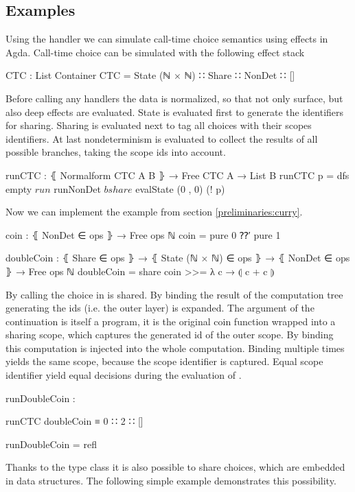 \subsection{Examples}

Using the handler we can simulate call-time choice semantics using effects in
Agda.
Call-time choice can be simulated with the following effect stack

\begin{code}
CTC : List Container
CTC = State (ℕ × ℕ) ∷ Share ∷ NonDet ∷ []
\end{code}
Before calling any handlers the data is normalized, so that not only surface,
but also deep effects are evaluated.
State is evaluated first to generate the identifiers for sharing.
Sharing is evaluated next to tag all choices with their scopes identifiers.
At last nondeterminism is evaluated to collect the results of all possible
branches, taking the scope ids into account.

\begin{code}
runCTC : ⦃ Normalform CTC A B ⦄ → Free CTC A → List B
runCTC p = dfs empty $ run $ runNonDet $ bshare $ evalState (0 , 0) (! p)
\end{code}
Now we can implement the  example from section
\ref{preliminaries:curry}.

\begin{code}
coin : ⦃ NonDet ∈ ops ⦄ → Free ops ℕ
coin = pure 0 ⁇′ pure 1

doubleCoin : ⦃ Share ∈ ops ⦄ → ⦃ State (ℕ × ℕ) ∈ ops ⦄ → ⦃ NonDet ∈ ops ⦄ →
  Free ops ℕ
doubleCoin = share coin >>= λ c → ⦇ c + c ⦈
\end{code}
By calling  the choice in  is shared.
By binding the result of  the computation tree generating
the ids (i.e. the outer layer) is expanded.
The argument of the continuation  is itself a program, it is the
original coin function wrapped into a sharing scope, which captures the
generated id of the outer scope.
By binding  this computation is injected into the whole
computation.
Binding  multiple times yields the same scope, because the scope
identifier is captured.
Equal scope identifier yield equal decisions during the evaluation of
.

\begin{center}
\begin{code}
runDoubleCoin :
\end{code}
\begin{code}[inline]
 runCTC doubleCoin ≡ 0 ∷ 2 ∷ []
\end{code}
\begin{code}
runDoubleCoin = refl
\end{code}
\end{center}
Thanks to the  type class it is also possible to share
choices, which are embedded in data structures.
The following simple example demonstrates this possibility.

